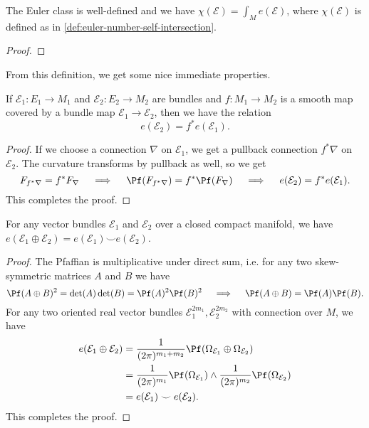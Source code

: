 \begin{theorem}
  The Euler class is well-defined and we have $\chi(\mathcal{E})=\int_M e(\mathcal{E})$, where $\chi(\mathcal{E})$ is defined as in \cref{def:euler-number-self-intersection}.
\end{theorem}
\begin{proof}
\end{proof}

From this definition, we get some nice immediate properties. 
\begin{proposition}\label{prop:euler-class-naturality}
  If $\mathcal{E}_1 : E_1 \to M_1$ and $\mathcal{E}_2 : E_2 \to M_2$ are bundles and 
  $f : M_1 \to M_2$ is a smooth map covered by a bundle map $\mathcal{E}_1\to \mathcal{E}_2$, then we have the relation
  \[
      e(\mathcal{E}_2) = f^* e(\mathcal{E}_1).
  \]
\end{proposition}
\begin{proof}
  If we choose a connection $\nabla$ on $\mathcal{E}_1$, we get a pullback connection $f^*\nabla$ on $\mathcal{E}_2$. The curvature transforms by pullback as well, so we get
  \[
      F_{f^*\nabla} = f^* F_{\nabla} \quad\implies\quad \Pf(F_{f^*\nabla}) = f^*\Pf(F_\nabla) \quad\implies\quad e(\mathcal{E}_2) = f^* e(\mathcal{E}_1). 
  \]
  This completes the proof.
\end{proof}

\begin{proposition}
  For any vector bundles $\mathcal{E}_1$ and $\mathcal{E}_2$ over a closed compact manifold, we have $e(\mathcal{E}_1\oplus \mathcal{E}_2)=e(\mathcal{E}_1)\smile e(\mathcal{E}_2)$.
\end{proposition}
\begin{proof}
The Pfaffian is multiplicative under direct sum, i.e. for any two skew-symmetric matrices $A$ and $B$ we have
\[
  \Pf(A\oplus B)^2 = \det(A)\det(B) = \Pf(A)^2\Pf(B)^2
  \quad\implies\quad
  \Pf(A\oplus B) = \Pf(A)\Pf(B).
\]
For any two oriented real vector bundles $\mathcal{E}_1^{2m_1},\mathcal{E}_2^{2m_2}$ with connection over $M$, we have 
\[
  \begin{aligned}
  e(\mathcal{E}_1\oplus\mathcal{E}_2) 
  &= \frac{1}{(2\pi)^{m_1+m_2}} \Pf(\Omega_{\mathcal{E}_1}\oplus \Omega_{\mathcal{E}_2}) \\
  &= \frac{1}{(2\pi)^{m_1}} \Pf(\Omega_{\mathcal{E}_1}) \wedge
  \frac{1}{(2\pi)^{m_2}} \Pf(\Omega_{\mathcal{E}_2}) \\
  &= e(\mathcal{E}_1)\smile e(\mathcal{E}_2).
  \end{aligned}
\]
This completes the proof.
\end{proof}

